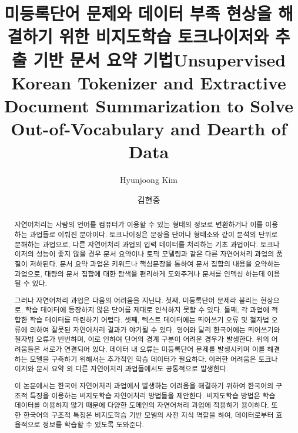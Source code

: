 \documentclass[oneside, ko,phd]{snuthesis_utf8_kor}
\title{미등록단어 문제와 데이터 부족 현상을 해결하기 위한 비지도학습 토크나이저와 추출 기반 문서 요약 기법}
\title*{Unsupervised Korean Tokenizer and Extractive Document Summarization to Solve Out-of-Vocabulary and Dearth of Data}
\author{Hyunjoong Kim}
\author*{김현중} %
\begin{document}
\makefrontcover
\makeapproval

\cleardoublepage
{}
\begin{abstract}
자연어처리는 사람의 언어를 컴퓨터가 이용할 수 있는 형태의 정보로 변환하거나 이를 이용하는 과업들로 이뤄진 분야이다.
토크나이징은 문장을 단어나 형태소와 같이 분석의 단위로 분해하는 과업으로, 다른 자연어처리 과업의 입력 데이터를 처리하는 기초 과업이다.
토크나이저의 성능이 좋지 않을 경우 문서 요약이나 토픽 모델링과 같은 다른 자연어처리 과업의 품질이 저하된다.
문서 요약 과업은 키워드나 핵심문장을 통하여 문서 집합의 내용을 요약하는 과업으로, 대량의 문서 집합에 대한 탐색을 편리하게 도와주거나 문서를 인덱싱 하는데 이용될 수 있다.

그러나 자연어처리 과업은 다음의 어려움을 지닌다.
첫째, 미등록단어 문제라 불리는 현상으로, 학습 데이터에 등장하지 않은 단어를 제대로 인식하지 못할 수 있다.
둘째, 각 과업에 적합한 학습 데이터를 마련하기 어렵다.
셋째, 텍스트 데이터에는 띄어쓰기 오류 및 철자법 오류에 의하여 잘못된 자연어처리 결과가 야기될 수 있다.
영어와 달리 한국어에는 띄어쓰기와 철자법 오류가 빈번하며, 이로 인하여 단어의 경계 구분이 어려운 경우가 발생한다.
위의 어려움들은 서로가 연결되어 있다.
데이터 내 오류는 미등록단어 문제를 발생시키며 이를 해결하는 모델을 구축하기 위해서는 추가적인 학습 데이터가 필요하다.
이러한 어려움은 토크나이저와 문서 요약 외 다른 자연어처리 과업들에서도 공통적으로 발생한다.

이 논문에서는 한국어 자연어처리 과업에서 발생하는 어려움을 해결하기 위하여 한국어의 구조적 특징을 이용하는 비지도학습 자연어처리 방법들을 제안한다.
비지도학습 방법은 학습 데이터를 이용하지 않기 때문에 다양한 도메인의 자연어처리 과업에 적용하기 용이하다.
또한 한국어의 구조적 특징은 비지도학습 기반 모델의 사전 지식 역할을 하여, 데이터로부터 효율적으로 정보를 학습할 수 있도록 도와준다.


\end{abstract}
\end{document}
